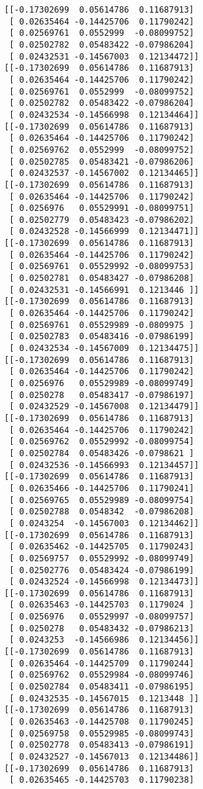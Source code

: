 \documentclass[11pt]{article}
\begin{document}
\begin{Verbatim}[commandchars=\\\{\}]
[[-0.17302699  0.05614786  0.11687913]
 [ 0.02635464 -0.14425706  0.11790242]
 [ 0.02569761  0.0552999  -0.08099752]
 [ 0.02502782  0.05483422 -0.07986204]
 [ 0.02432531 -0.14567003  0.12134472]]
[[-0.17302699  0.05614786  0.11687913]
 [ 0.02635464 -0.14425706  0.11790242]
 [ 0.02569761  0.0552999  -0.08099752]
 [ 0.02502782  0.05483422 -0.07986204]
 [ 0.02432534 -0.14566998  0.12134464]]
[[-0.17302699  0.05614786  0.11687913]
 [ 0.02635464 -0.14425706  0.11790242]
 [ 0.02569762  0.0552999  -0.08099752]
 [ 0.02502785  0.05483421 -0.07986206]
 [ 0.02432537 -0.14567002  0.12134465]]
[[-0.17302699  0.05614786  0.11687913]
 [ 0.02635464 -0.14425706  0.11790242]
 [ 0.0256976   0.05529991 -0.08099751]
 [ 0.02502779  0.05483423 -0.07986202]
 [ 0.02432528 -0.14566999  0.12134471]]
[[-0.17302699  0.05614786  0.11687913]
 [ 0.02635464 -0.14425706  0.11790242]
 [ 0.02569761  0.05529992 -0.08099753]
 [ 0.02502781  0.05483427 -0.07986208]
 [ 0.02432531 -0.14566991  0.1213446 ]]
[[-0.17302699  0.05614786  0.11687913]
 [ 0.02635464 -0.14425706  0.11790242]
 [ 0.02569761  0.05529989 -0.0809975 ]
 [ 0.02502783  0.05483416 -0.07986199]
 [ 0.02432534 -0.14567009  0.12134475]]
[[-0.17302699  0.05614786  0.11687913]
 [ 0.02635464 -0.14425706  0.11790242]
 [ 0.0256976   0.05529989 -0.08099749]
 [ 0.0250278   0.05483417 -0.07986197]
 [ 0.02432529 -0.14567008  0.12134479]]
[[-0.17302699  0.05614786  0.11687913]
 [ 0.02635464 -0.14425706  0.11790242]
 [ 0.02569762  0.05529992 -0.08099754]
 [ 0.02502784  0.05483426 -0.0798621 ]
 [ 0.02432536 -0.14566993  0.12134457]]
[[-0.17302699  0.05614786  0.11687913]
 [ 0.02635466 -0.14425706  0.11790241]
 [ 0.02569765  0.05529989 -0.08099754]
 [ 0.02502788  0.0548342  -0.07986208]
 [ 0.0243254  -0.14567003  0.12134462]]
[[-0.17302699  0.05614786  0.11687913]
 [ 0.02635462 -0.14425705  0.11790243]
 [ 0.02569757  0.05529992 -0.08099749]
 [ 0.02502776  0.05483424 -0.07986199]
 [ 0.02432524 -0.14566998  0.12134473]]
[[-0.17302699  0.05614786  0.11687913]
 [ 0.02635463 -0.14425703  0.1179024 ]
 [ 0.0256976   0.05529997 -0.08099757]
 [ 0.0250278   0.05483432 -0.07986213]
 [ 0.0243253  -0.14566986  0.12134456]]
[[-0.17302699  0.05614786  0.11687913]
 [ 0.02635464 -0.14425709  0.11790244]
 [ 0.02569762  0.05529984 -0.08099746]
 [ 0.02502784  0.05483411 -0.07986195]
 [ 0.02432535 -0.14567015  0.1213448 ]]
[[-0.17302699  0.05614786  0.11687913]
 [ 0.02635463 -0.14425708  0.11790245]
 [ 0.02569758  0.05529985 -0.08099743]
 [ 0.02502778  0.05483413 -0.07986191]
 [ 0.02432527 -0.14567013  0.12134486]]
[[-0.17302699  0.05614786  0.11687913]
 [ 0.02635465 -0.14425703  0.11790238]

\end{Verbatim}
\end{document}
